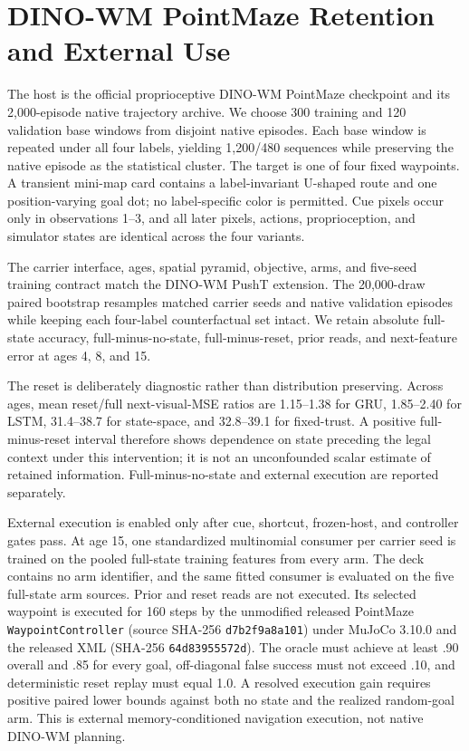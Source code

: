 \PaperDinoPushTResults

\section{DINO-WM PointMaze Retention and External Use}
\label{app:pointmaze}

The host is the official proprioceptive DINO-WM PointMaze checkpoint and its
2,000-episode native trajectory archive.  We choose 300 training and 120
validation base windows from disjoint native episodes.  Each base window is
repeated under all four labels, yielding 1,200/480 sequences while preserving
the native episode as the statistical cluster.  The target is one of four fixed
waypoints.  A transient mini-map card contains a label-invariant U-shaped route
and one position-varying goal dot; no label-specific color is permitted.  Cue
pixels occur only in observations 1--3, and all later pixels, actions,
proprioception, and simulator states are identical across the four variants.

The carrier interface, ages, spatial pyramid, objective, arms, and five-seed
training contract match the DINO-WM PushT extension.  The 20,000-draw paired
bootstrap resamples matched carrier seeds and native validation episodes while
keeping each four-label counterfactual set intact.  We retain absolute
full-state accuracy, full-minus-no-state, full-minus-reset, prior reads, and
next-feature error at ages 4, 8, and 15.

The reset is deliberately diagnostic rather than distribution preserving.
Across ages, mean reset/full next-visual-MSE ratios are 1.15--1.38 for GRU,
1.85--2.40 for LSTM, 31.4--38.7 for state-space, and 32.8--39.1 for
fixed-trust.  A positive full-minus-reset interval therefore shows dependence
on state preceding the legal context under this intervention; it is not an
unconfounded scalar estimate of retained information.  Full-minus-no-state and
external execution are reported separately.

External execution is enabled only after cue, shortcut, frozen-host, and
controller gates pass.  At age 15, one standardized multinomial consumer per
carrier seed is trained on the pooled full-state training features from every
arm.  The deck contains no arm identifier, and the same fitted consumer is
evaluated on the five full-state arm sources.  Prior and reset reads are not
executed.  Its selected waypoint is executed
for 160 steps by the unmodified released PointMaze
\texttt{WaypointController} (source SHA-256 \texttt{d7b2f9a8a101}) under
MuJoCo 3.10.0 and the released XML (SHA-256 \texttt{64d83955572d}).  The oracle
must achieve at least .90
overall and .85 for every goal, off-diagonal false success must not exceed .10,
and deterministic reset replay must equal 1.0.  A resolved execution gain
requires positive paired lower bounds against both no state and the realized
random-goal arm.  This is external memory-conditioned navigation execution,
not native DINO-WM planning.


